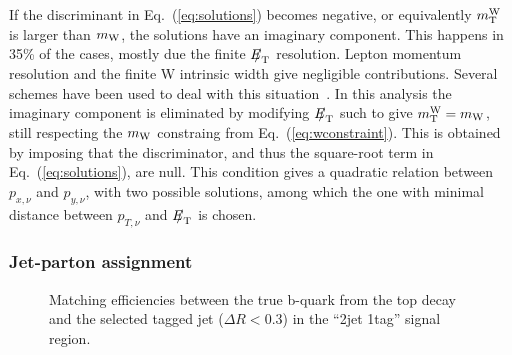 If the discriminant in Eq.~(\ref{eq:solutions}) becomes negative, or equivalently $m_{\mathrm{\rm T}}^{\rm W}$ is larger than $m_{\mathrm{\rm W}}$, 
the solutions have an imaginary component. 
This happens in 35\% of the cases, mostly due the finite ${E\!\!\!/}_{\mathrm{T}}$ resolution. Lepton momentum resolution and the finite W intrinsic width give negligible contributions.
Several schemes have been used to deal with this situation~\cite{Abazov:2009ii, Aaltonen:2009jj}. In this analysis the imaginary component is eliminated by modifying ${E\!\!\!/}_{\mathrm{T}}$ such to give $m_{\mathrm{\rm T}}^{\rm W} = m_{\mathrm{\rm W}}$, still respecting the $m_{\mathrm{\rm W}}$ constraing from Eq.~(\ref{eq:wconstraint}). This is obtained by imposing that the discriminator, and thus the square-root term in Eq.~(\ref{eq:solutions}), are null. This condition gives a quadratic relation between 
$p_{x,\nu}$ and $p_{y,\nu}$, with two possible solutions, 
among which the one with minimal distance between $p_{T,\nu}$ and ${E\!\!\!/}_{\mathrm{T}}$ is chosen.


\subsubsection{Jet-parton assignment}

\begin{figure}[hbpt]
\begin{center}
\hspace{0.05\textwidth}
\caption{\label{fig:2j1t_matching_bjet_topdecay}Matching efficiencies between the true b-quark from the top decay and the selected tagged jet ($\Delta R<0.3$) in the ``2jet 1tag'' signal region.}
\end{center}
\end{figure}

